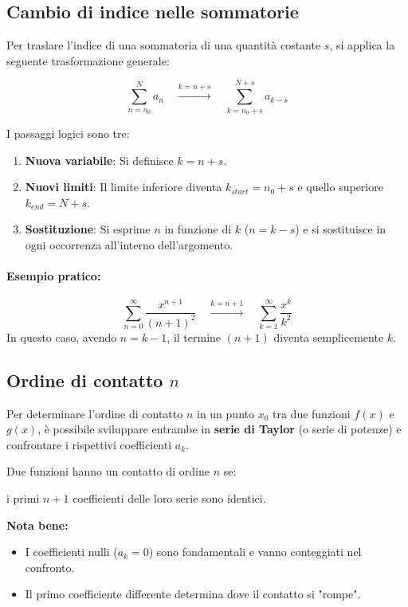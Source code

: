 \subsection*{Cambio di indice nelle sommatorie}

Per traslare l'indice di una sommatoria di una quantità costante $s$, si applica la seguente trasformazione generale:

\begin{equation*}
\sum_{n=n_0}^{N} a_n \quad \xrightarrow{k = n + s} \quad \sum_{k=n_0+s}^{N+s} a_{k-s}
\end{equation*}

I passaggi logici sono tre:
\begin{enumerate}
    \item \textbf{Nuova variabile}: Si definisce $k = n + s$.
    \item \textbf{Nuovi limiti}: Il limite inferiore diventa $k_{start} = n_0 + s$ e quello superiore $k_{end} = N + s$.
    \item \textbf{Sostituzione}: Si esprime $n$ in funzione di $k$ ($n = k - s$) e si sostituisce in ogni occorrenza all'interno dell'argomento.
\end{enumerate}

\paragraph{Esempio pratico:}
\begin{equation*}
\sum_{n=0}^{\infty} \frac{x^{n+1}}{(n+1)^2} \quad \xrightarrow{k = n + 1} \quad \sum_{k=1}^{\infty} \frac{x^k}{k^2}
\end{equation*}
In questo caso, avendo $n = k - 1$, il termine $(n+1)$ diventa semplicemente $k$.

\subsection{Ordine di contatto $n$}

Per determinare l'ordine di contatto $n$ in un punto $x_0$ tra due funzioni $f(x)$ e $g(x)$, è possibile sviluppare entrambe in \textbf{serie di Taylor} (o serie di potenze) e confrontare i rispettivi coefficienti $a_k$.

Due funzioni hanno un contatto di ordine $n$ se:

i primi $n+1$ coefficienti delle loro serie sono identici.

\textbf{Nota bene:} 
\begin{itemize}
    \item I coefficienti nulli (\(a_k = 0\)) sono fondamentali e vanno conteggiati nel confronto.
    \item Il primo coefficiente differente determina dove il contatto si "rompe".
\end{itemize}

